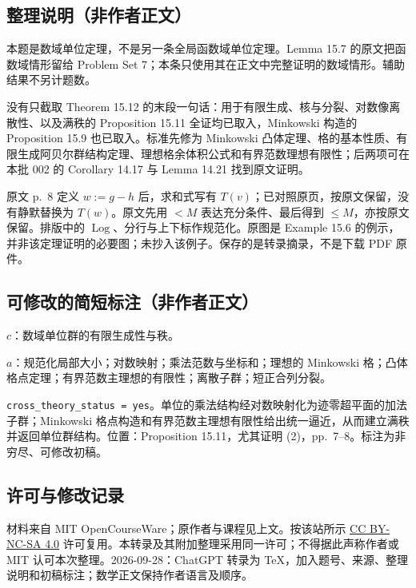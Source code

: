 \documentclass[UTF8,11pt]{ctexart}
\begin{document}
\subsection*{整理说明（非作者正文）}
本题是数域单位定理，不是另一条全局函数域单位定理。Lemma 15.7 的原文把函数域情形留给 Problem Set 7；本条只使用其在正文中完整证明的数域情形。辅助结果不另计题数。

没有只截取 Theorem 15.12 的末段一句话：用于有限生成、核与分裂、对数像离散性、以及满秩的 Proposition 15.11 全证均已取入，Minkowski 构造的 Proposition 15.9 也已取入。标准先修为 Minkowski 凸体定理、格的基本性质、有限生成阿贝尔群结构定理、理想格余体积公式和有界范数理想有限性；后两项可在本批 002 的 Corollary 14.17 与 Lemma 14.21 找到原文证明。

原文 p.~8 定义 $w:=g-h$ 后，求和式写有 $T(v)$；已对照原页，按原文保留，没有静默替换为 $T(w)$。原文先用 $<M$ 表达充分条件、最后得到 $\leq M$，亦按原文保留。排版中的 $\operatorname{Log}$、分行与上下标作规范化。原图是 Example 15.6 的例示，并非该定理证明的必要图；未抄入该例子。保存的是转录摘录，不是下载 PDF 原件。

\subsection*{可修改的简短标注（非作者正文）}
$c$：数域单位群的有限生成性与秩。

$a$：规范化局部大小；对数映射；乘法范数与坐标和；理想的 Minkowski 格；凸体格点定理；有界范数主理想的有限性；离散子群；短正合列分裂。

\texttt{cross\_theory\_status = yes}。单位的乘法结构经对数映射化为迹零超平面的加法子群；Minkowski 格点构造和有界范数主理想有限性给出统一逼近，从而建立满秩并返回单位群结构。位置：Proposition 15.11，尤其证明 (2)，pp.~7--8。标注为非穷尽、可修改初稿。
\subsection*{许可与修改记录}
材料来自 MIT OpenCourseWare；原作者与课程见上文。按该站所示 \href{https://creativecommons.org/licenses/by-nc-sa/4.0/}{CC BY-NC-SA 4.0} 许可复用。本转录及其附加整理采用同一许可；不得据此声称作者或 MIT 认可本次整理。2026-09-28：ChatGPT 转录为 TeX，加入题号、来源、整理说明和初稿标注；数学正文保持作者语言及顺序。
\end{document}
